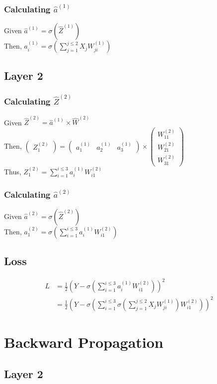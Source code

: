 \documentclass[sigconf, nonacm]{acmart}
\begin{document}
\subsubsection{Calculating $\hat{a}^{(1)}$}
Given $\hat{a}^{(1)} = \sigma(\hat{Z}^{(1)})$\\
Then,
$a^{(1)}_{i} = \sigma(\sum_{j=1}^{j \le 2} X_j W^{(1)}_{ji})$

\subsection{Layer 2}
\subsubsection{Calculating $\hat{Z}^{(2)}$}
Given $\hat{Z}^{(2)} = \hat{a}^{(1)} \times \hat{W}^{(2)}$\\
Then, $\begin{pmatrix}
Z^{(2)}_1
\end{pmatrix} = \begin{pmatrix}
a^{(1)}_1 &
a^{(1)}_2 &
a^{(1)}_3
\end{pmatrix} \times \begin{pmatrix}
W^{(2)}_{11}\\
W^{(2)}_{21}\\
W^{(2)}_{31}
\end{pmatrix}$\\
Thus,
$Z^{(2)}_{1} = \sum_{i=1}^{i \le 3} a^{(1)}_i W^{(2)}_{i1}$

\subsubsection{Calculating $\hat{a}^{(2)}$}
Given $\hat{a}^{(2)} = \sigma(\hat{Z}^{(2)})$\\
Then,
$a^{(2)}_1 = \sigma(\sum_{i=1}^{i \le 3} a^{(1)}_i W^{(2)}_{i1})$

\subsection{Loss}
\begin{align*}
L &= \frac{1}{2}(\hat{Y} - \sigma(\sum_{i=1}^{i \le 3} a^{(1)}_i W^{(2)}_{i1}))^2\\
 &= \frac{1}{2}(\hat{Y} - \sigma(\sum_{i=1}^{i \le 3} \sigma(\sum_{j=1}^{j \le 2} X_j W^{(1)}_{ji}) W^{(2)}_{i1}))^2
\end{align*}


\section{Backward Propagation}
\subsection{Layer 2}


% 
% 
\end{document}

